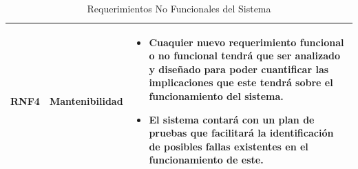 \begin{table}[htb]
\begin{tabular}{| p{1.5cm} |  p{2.5cm} | p{11.5cm}|}
\\ \hline
RNF4 & Mantenibilidad & \begin{itemize}
   \item Cuaquier nuevo requerimiento funcional o no funcional tendrá que ser analizado y diseñado para poder cuantificar las implicaciones que este tendrá sobre el funcionamiento del sistema. 
   \item El sistema contará con un plan de pruebas que facilitará la identificación de posibles fallas existentes en el funcionamiento de este. 
 \end{itemize}
\\ \hline

\end{tabular}
\caption{Requerimientos No Funcionales del Sistema}
\label{Requerimientos No Funcionales del Sistema }
\end{table}
